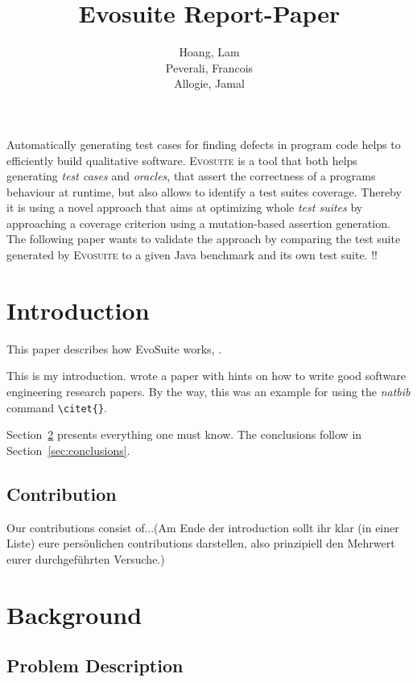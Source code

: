 \documentclass[pdftex,english,oribibl]{llncs}
\title{Evosuite Report-Paper}
\author{Hoang, Lam\\ Peverali, Francois \\ Allogie, Jamal}
\institute{Humboldt University of Berlin\\Department of Computer Science\\12489 Berlin, Germany}
\makeatletter
\gdef\@keywords{}
\renewenvironment{abstract}{%
  \list{}{\advance\topsep by0.35cm\relax\small%
          \leftmargin=1cm%
          \labelwidth=\z@%
          \listparindent=\z@%
          \itemindent\listparindent%
          \rightmargin\leftmargin}%
          \item[\hskip\labelsep\bfseries\abstractname]}{%
  \if!\@keywords!\else{\item[~]\item[\hskip\labelsep\bfseries\keywordname]\@keywords}\fi%
  \endlist}
\makeatother
\begin{document}
\maketitle

\begin{abstract}
  Automatically generating test cases for finding defects in program code helps to efficiently build qualitative software. \textsc{Evosuite} is a tool that both helps generating \textit{test cases} and \textit{oracles}, that assert the correctness of a programs behaviour at runtime, but also allows to identify a test suites coverage. Thereby it is using a novel approach that aims at optimizing whole \textit{test suites} by approaching a coverage criterion using a mutation-based assertion generation. The following paper wants to validate the approach by comparing the test suite generated by \textsc{Evosuite}  to a given Java benchmark and its own test suite.
\end{abstract}

\section{Introduction}

This paper describes how EvoSuite works, \citet{fraser2011evosuite}.

This is my introduction. \citet{Shaw2003WritingGoodSoftwareEngineeringResearchPapersMinitutorial} wrote a paper with hints on how to write good software engineering research papers. By the way, this was an example for using the \textit{natbib} command \texttt{\textbackslash{}citet\{\}}.

  Section~\ref{sec:anotherSection} presents everything one must know. The conclusions follow in Section~\ref{sec:conclusions}.

\subsection{Contribution}

Our contributions consist of...(Am Ende der introduction sollt ihr klar (in einer Liste) eure persönlichen contributions darstellen, also prinzipiell den Mehrwert eurer durchgeführten Versuche.)


\section{Background}\label{sec:anotherSection}

\subsection{Problem Description} 
\end{document}
